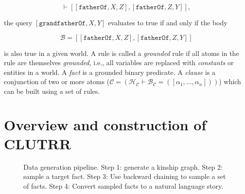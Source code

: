 \documentclass[letterpaper, 12pt]{report}
\begin{document}
\begin{equation}
  [\texttt{grandfatherOf},X,Y] \vdash [[\texttt{fatherOf},X,Z], [\texttt{fatherOf}, Z,Y]],
\end{equation}

\noindent the query $[\texttt{grandfatherOf},X,Y]$ evaluates to true if and only if the body

\begin{equation}
\mathcal{B}=[[\texttt{fatherOf},X,Z], [\texttt{fatherOf}, Z,Y]]
\end{equation}

\noindent is also true in a given world.
A rule is called a \textit{grounded} rule if all atoms in the rule are themselves \textit{grounded}, i.e., all variables are replaced with \textit{constants} or entities in a world. A \textit{fact} is a grounded binary predicate. A \textit{clause} is a conjunction of two or more atoms ($\mathcal{C}=(\mathcal{H}_{\mathcal{C}} \vdash \mathcal{B}_{\mathcal{C}} = ([\alpha_1,...,\alpha_n]))$) which can be built using a set of rules.

\section{Overview and construction of CLUTRR}
\label{sec:orgf6fb520}

\begin{figure}[t]
\centering
{}
\caption{Data generation pipeline. Step 1: generate a kinship graph. Step 2: sample a target fact. Step 3: Use backward chaining to sample a set of facts. Step 4: Convert sampled facts to a natural language story.}
\label{fig:clutrr:data}
\end{figure}
\end{document}
